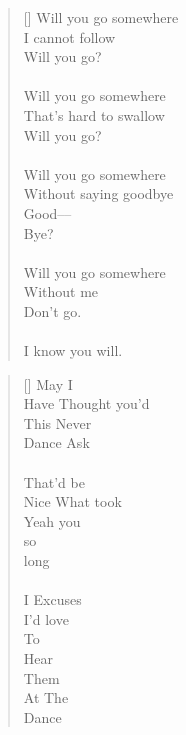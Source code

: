 \documentclass{article}
\begin{document}
\settowidth{\versewidth}{Than Tycho Brahe, or Erra Pater:}
\begin{verse}[\versewidth]
Will you go somewhere \\
I cannot follow \\
Will you go? \\
\\
Will you go somewhere \\
That's hard to swallow \\
Will you go? \\
\\
Will you go somewhere \\
Without saying goodbye \\
Good–– \\
Bye? \\
\\
Will you go somewhere \\
Without me \\
Don't go. \\
\\
I know you will.
\end{verse}

\newcommand\tab[1][1cm]{\hspace*{#1}}

\settowidth{\versewidth}{Than Tycho Brahe, or Erra Pater:}
\begin{verse}[\versewidth]
May I \\
Have \tab \tab Thought you'd \\
This \tab \tab Never \\
Dance \tab Ask \\
\\
That'd be \\
Nice \tab \tab What took \\
Yeah \tab \tab you \\
\tab \tab so \\
\tab long \\
\\
I \tab \tab \tab Excuses \\
\tab \tab I'd love \\
\tab \tab To \\
\tab \tab Hear \\
\tab \tab Them \\
At \tab \tab The \\
\tab Dance \\
\end{verse}
\end{document}
